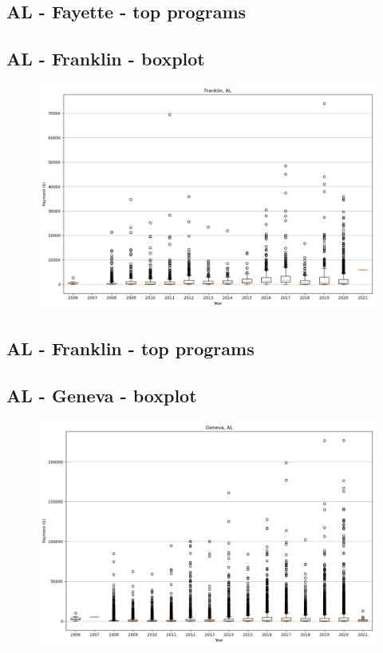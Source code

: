 \subsection*{AL - Fayette - top programs}

\newpage
\subsection*{AL - Franklin - boxplot}
\begin{figure}[h]
\centering
\includegraphics[width=7in]{../output/boxplots/counties/Franklin-AL_boxplot.png}
\end{figure}


\subsection*{AL - Franklin - top programs}

\newpage
\subsection*{AL - Geneva - boxplot}
\begin{figure}[h]
\centering
\includegraphics[width=7in]{../output/boxplots/counties/Geneva-AL_boxplot.png}
\end{figure}


